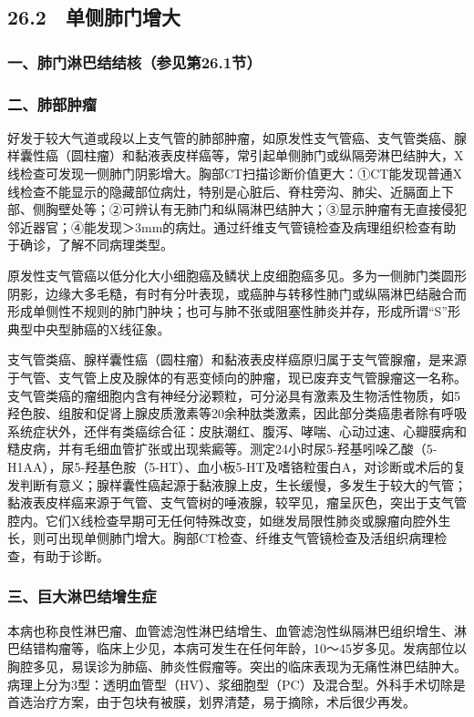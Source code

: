 \subsection{26.2　单侧肺门增大}

\subsubsection{一、肺门淋巴结结核（参见第26.1节）}

\subsubsection{二、肺部肿瘤}

好发于较大气道或段以上支气管的肺部肿瘤，如原发性支气管癌、支气管类癌、腺样囊性癌（圆柱瘤）和黏液表皮样癌等，常引起单侧肺门或纵隔旁淋巴结肿大，X线检查可发现一侧肺门阴影增大。胸部CT扫描诊断价值更大：①CT能发现普通X线检查不能显示的隐藏部位病灶，特别是心脏后、脊柱旁沟、肺尖、近膈面上下部、侧胸壁处等；②可辨认有无肺门和纵隔淋巴结肿大；③显示肿瘤有无直接侵犯邻近器官；④能发现＞3mm的病灶。通过纤维支气管镜检查及病理组织检查有助于确诊，了解不同病理类型。

原发性支气管癌以低分化大小细胞癌及鳞状上皮细胞癌多见。多为一侧肺门类圆形阴影，边缘大多毛糙，有时有分叶表现，或癌肿与转移性肺门或纵隔淋巴结融合而形成单侧性不规则的肺门肿块；也可与肺不张或阻塞性肺炎并存，形成所谓“S”形典型中央型肺癌的X线征象。

支气管类癌、腺样囊性癌（圆柱瘤）和黏液表皮样癌原归属于支气管腺瘤，是来源于气管、支气管上皮及腺体的有恶变倾向的肿瘤，现已废弃支气管腺瘤这一名称。支气管类癌的瘤细胞内含有神经分泌颗粒，可分泌具有激素及生物活性物质，如5羟色胺、组胺和促肾上腺皮质激素等20余种肽类激素，因此部分类癌患者除有呼吸系统症状外，还伴有类癌综合征：皮肤潮红、腹泻、哮喘、心动过速、心瓣膜病和糙皮病，并有毛细血管扩张或出现紫癜等。测定24小时尿5-羟基吲哚乙酸（5-H1AA），尿5-羟基色胺（5-HT）、血小板5-HT及嗜铬粒蛋白A，对诊断或术后的复发判断有意义；腺样囊性癌起源于黏液腺上皮，生长缓慢，多发生于较大的气管；黏液表皮样癌来源于气管、支气管树的唾液腺，较罕见，瘤呈灰色，突出于支气管腔内。它们X线检查早期可无任何特殊改变，如继发局限性肺炎或腺瘤向腔外生长，则可出现单侧肺门增大。胸部CT检查、纤维支气管镜检查及活组织病理检查，有助于诊断。

\subsubsection{三、巨大淋巴结增生症}

本病也称良性淋巴瘤、血管滤泡性淋巴结增生、血管滤泡性纵隔淋巴组织增生、淋巴结错构瘤等，临床上少见，本病可发生在任何年龄，10～45岁多见。发病部位以胸腔多见，易误诊为肺癌、肺炎性假瘤等。突出的临床表现为无痛性淋巴结肿大。病理上分为3型：透明血管型（HV）、浆细胞型（PC）及混合型。外科手术切除是首选治疗方案，由于包块有被膜，划界清楚，易于摘除，术后很少再发。

